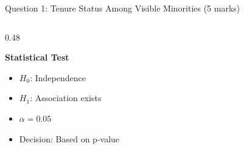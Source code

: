 \documentclass[aspectratio=169]{beamer}
\begin{document}
\begin{frame}{Question 1: Tenure Status Among Visible Minorities (5 marks)}
\begin{columns}[T]
\begin{column}{0.48\textwidth}
            \vspace{0.3cm}

            \textbf{Statistical Test}
            \begin{itemize}
                \item $H_0$: Independence
                \item $H_1$: Association exists
                \item $\alpha = 0.05$
                \item Decision: Based on p-value
            \end{itemize}
        \end{column}
    \end{columns}
\end{frame}

\end{document}
